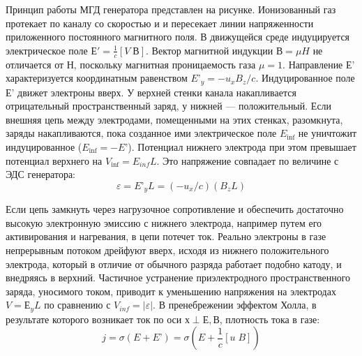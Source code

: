 \documentclass[10pt, a4paper]{article}
\numberwithin{equation}{section}
\begin{document}
\begin{figure}[h!]
\end{figure}

Принцип работы МГД генератора представлен на рисунке. Ионизованный газ протекает по каналу со скоростью и и пересекает линии напряженности приложенного постоянного магнитного поля. В движущейся среде индуцируется электрическое поле $Е' =\frac{1}{c} [V\; В]$. Вектор магнитной индукции $В =\mu H$ не отличается от $Н$, поскольку магнитная проницаемость газа $\mu=1$. Направление Е' характеризуется  
координатным равенством $E’_y=-u_x B_z / c $. Индуцированное поле Е' движет электроны вверх. У верхней  
стенки канала накапливается отрицательный пространственный заряд, у нижней — положительный. Если внешняя цепь между электродами, помещенными на этих стенках, разомкнута, заряды накапливаются, пока созданное ими электрическое поле $E_{\inf}$ не уничтожит индуцированное ($E_{\inf}=-E’$). Потенциал нижнего электрода при этом превышает потенциал верхнего на $V_{\inf} = E_{inf} L$. Это напряжение совпадает по величине с ЭДС генератора:
\begin{equation}
	\varepsilon=E’_{y}L=(-u_x /c)(B_z L)
\end{equation}

Если цепь замкнуть через нагрузочное сопротивление и обеспечить достаточно высокую электронную эмиссию с нижнего электрода, например путем его активирования и нагревания, в цепи потечет ток. Реально электроны в газе непрерывным потоком дрейфуют вверх, исходя из нижнего положительного электрода, который в отличие от обычного разряда работает подобно катоду, и внедряясь в верхний. Частичное устранение приэлектродного пространственного заряда, уносимого током, приводит к уменьшению напряжения на электродах $V= Е_{y} L$ по сравнению с $V_{inf}=|\varepsilon|$. В пренебрежении эффектом Холла, в результате которого возникает ток по оси $х \perp Е, В$, плотность тока в газе:
\begin{equation}
	j=\sigma(E+E’)=\sigma(E+\frac{1}{c}[u\;B])
\end{equation}
\end{document}
